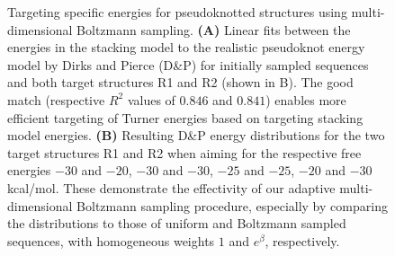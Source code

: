 \documentclass[]{bmcart}
\makeatletter
\newlength{\@aligneps}
\newcommand{\includegraphicstop}[2][]{%
\sbox{\@alignepsbox}{\texttt{[image: \#2]}}%
\setlength{\@aligneps}{-\ht\@alignepsbox}%
\addtolength{\@aligneps}{2ex}%
\raisebox{\@aligneps}{\usebox{\@alignepsbox}}}
\newcommand{\revised}[1]{{\color{red} #1}}
\makeatother
\begin{document}
\begin{figure}[t]
  \begin{center}
    \includegraphicstop[width=0.97\textwidth]{Figs/energy_shift}\hfill
  \end{center}
  \caption{%
    Targeting specific energies for pseudoknotted structures using
    multi-dimensional Boltzmann sampling. \textbf{(A)} Linear fits between the
    energies in the stacking model to the realistic pseudoknot energy
    model by Dirks and Pierce (D\&P) for \revised{initially} sampled sequences and both target structures R1 and R2 (shown in B). The good
    match \revised{(respective $R^2$ values of $0.846$ and $0.841$)} enables more efficient targeting of Turner energies based on
    targeting stacking model energies. \textbf{(B)} \revised{Resulting D\&P energy distributions for the two target structures R1 and R2 when aiming for the respective free energies $-30$ and $-20$,
    $-30$ and $-30$, $-25$ and $-25$, $-20$ and $-30$\,kcal/mol. These demonstrate the effectivity of our adaptive
    multi-dimensional Boltzmann sampling procedure, especially by} comparing the distributions to those of uniform and Boltzmann sampled sequences, with homogeneous weights $1$ and
    $e^\beta$, respectively.
  }
  \label{fig:energydist-pk}
\end{figure}
\end{document}
